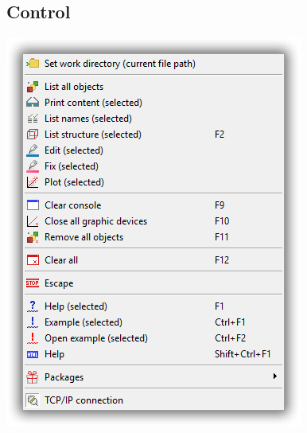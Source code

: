 \hypertarget{menu_r_control}{}
\subsection{Control}

\includegraphics[scale=0.50]{./res/menu_r_control.png}\\

